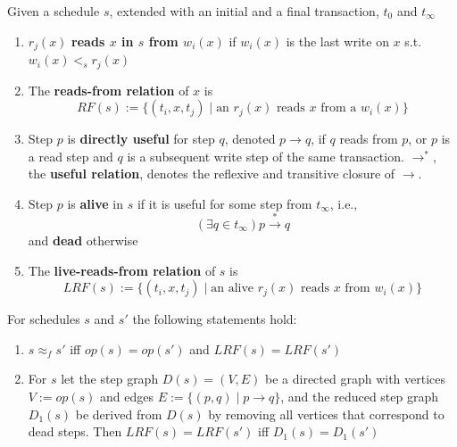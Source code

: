 \documentclass[11pt]{article}
\begin{document}
\begin{definition}
Given a schedule \(s\), extended with an initial and a final transaction, \(t_0\)
and \(t_\infty\)
\begin{enumerate}
\item \(r_j(x)\) \textbf{reads \(x\) in \(s\) from \(w_i(x)\)} if \(w_i(x)\) is the last write on \(x\)
s.t. \(w_i(x)<_sr_j(x)\)
\item The \textbf{reads-from relation} of \(x\) is
\begin{equation*}
RF(s):=\{(t_i,x,t_j)\mid \text{an }r_j(x)\text{ reads \(x\) from a }w_i(x)\}
\end{equation*}
\item Step \(p\) is \textbf{directly useful} for step \(q\), denoted \(p\to q\), if \(q\) reads from \(p\),
or \(p\) is a read step and \(q\) is a subsequent write step of the same
transaction. \(\to^*\), the \textbf{useful relation}, denotes the reflexive and transitive closure of \(\to\).
\item Step \(p\) is \textbf{alive} in \(s\) if it is useful for some step from \(t_\infty\), i.e.,
\begin{equation*}
(\exists q\in t_\infty)p\xrightarrow{*}q
\end{equation*}
and \textbf{dead} otherwise
\item The \textbf{live-reads-from relation} of \(s\) is
\begin{equation*}
LRF(s):=\{(t_i,x,t_j)\mid \text{an alive \(r_j(x)\) reads \(x\) from \(w_i(x)\)}\}
\end{equation*}
\end{enumerate}
\end{definition}

\begin{theorem}[]
For schedules \(s\) and \(s'\) the following statements hold:
\begin{enumerate}
\item \(s\approx_fs'\) iff \(op(s)=op(s')\) and \(LRF(s)=LRF(s')\)
\item For \(s\) let the step graph \(D(s)=(V,E)\) be a directed graph with vertices \(V:=op(s)\)
and edges \(E:=\{(p,q)\mid p\to q\}\), and the reduced step graph \(D_1(s)\) be derived
from \(D(s)\) by removing all vertices that correspond to dead steps. Then \(LRF(s)=LRF(s')\)
iff \(D_1(s)=D_1(s')\)
\end{enumerate}
\end{theorem}
\end{document}
